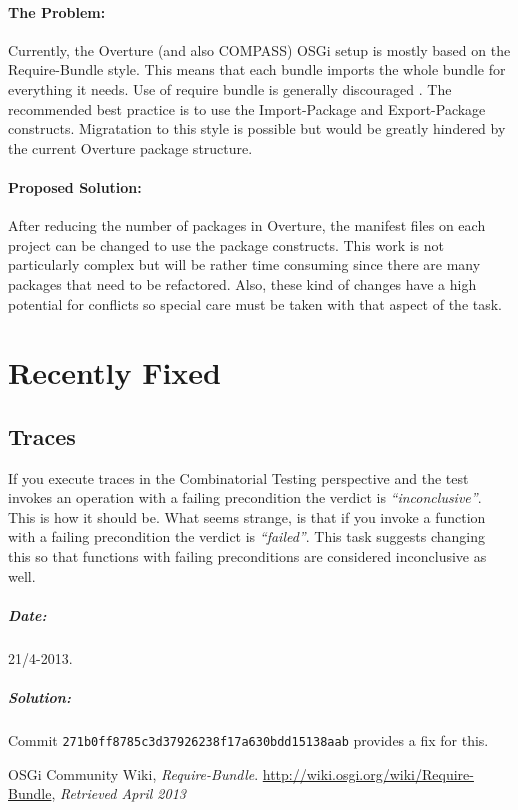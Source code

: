 \documentclass[11pt]{overturerep} \usepackage{t1enc,times,a4,t1enc}
\begin{document}
\subsubsection{The Problem:} Currently, the Overture (and also COMPASS)
OSGi setup is mostly based on the \textsf{Require-Bundle} style. This means
that each bundle imports the whole bundle for everything it needs. Use of
require bundle is generally discouraged \cite{osgi2013}. The recommended
best practice is to use the \textsf{Import-Package} and
\textsf{Export-Package} constructs. Migratation to this style is possible
but would be greatly hindered by the current Overture package structure.


\subsubsection{Proposed Solution:} After reducing the number of packages in
Overture, the manifest files on each project can be changed to use the
package constructs. This work is not particularly complex but will be
rather time consuming since there are many packages that need to be
refactored. Also, these kind of changes have a high potential for conflicts
so special care must be taken with that aspect of the task.







\chapter{Recently Fixed}

\section{Traces}

If you execute traces in the Combinatorial Testing perspective and the test
invokes an operation with a failing precondition the verdict is
\textit{``inconclusive''}. This is how it should be. What seems strange, is
that if you invoke a function with a failing precondition the verdict is
\textit{``failed''}. This task suggests changing this so that functions with
failing preconditions are considered inconclusive as well.

\paragraph{Date:} 21/4-2013.

\paragraph{Solution:} Commit \texttt{271b0ff8785c3d37926238f17a630bdd15138aab}
provides a fix for this.



\begin{thebibliography}{9}

     OSGi Community Wiki, \emph{Require-Bundle}.
        \url{http://wiki.osgi.org/wiki/Require-Bundle}, \emph{Retrieved April 2013}

\end{thebibliography} 
\end{document}
